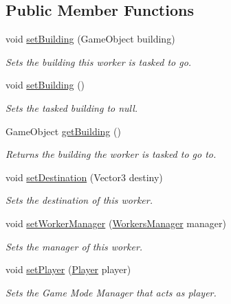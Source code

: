 \subsection*{Public Member Functions}
\begin{DoxyCompactItemize}
\item 
void \mbox{\hyperlink{class_worker_afe55750c4fb5679683417e717f3aa399}{set\+Building}} (Game\+Object building)
\begin{DoxyCompactList}\small\item\em Sets the building this worker is tasked to go. \end{DoxyCompactList}\item 
void \mbox{\hyperlink{class_worker_ae7adec62661e7e34f7fa2a482ead0ff3}{set\+Building}} ()
\begin{DoxyCompactList}\small\item\em Sets the tasked building to null. \end{DoxyCompactList}\item 
Game\+Object \mbox{\hyperlink{class_worker_a02dbad705674cab848e27a8900711fa0}{get\+Building}} ()
\begin{DoxyCompactList}\small\item\em Returns the building the worker is tasked to go to. \end{DoxyCompactList}\item 
void \mbox{\hyperlink{class_worker_ae01182ca082cf86ec49d6392654a90a1}{set\+Destination}} (Vector3 destiny)
\begin{DoxyCompactList}\small\item\em Sets the destination of this worker. \end{DoxyCompactList}\item 
void \mbox{\hyperlink{class_worker_a72be600dcec9d710cfc8ab1cc42044d6}{set\+Worker\+Manager}} (\mbox{\hyperlink{class_workers_manager}{Workers\+Manager}} manager)
\begin{DoxyCompactList}\small\item\em Sets the manager of this worker. \end{DoxyCompactList}\item 
void \mbox{\hyperlink{class_worker_a9bcae4b811749fe167231b32480e5fe1}{set\+Player}} (\mbox{\hyperlink{class_player}{Player}} player)
\begin{DoxyCompactList}\small\item\em Sets the Game Mode Manager that acts as player. \end{DoxyCompactList}\item 

\end{DoxyCompactItemize}
